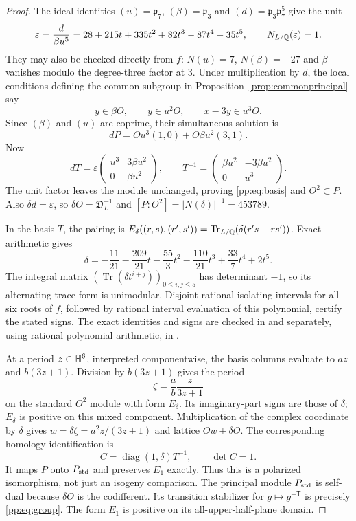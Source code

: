\begin{proof}
The ideal identities $(u)=\mathfrak p_7$, $(\beta)=\mathfrak p_3$ and
$(d)=\mathfrak p_3\mathfrak p_7^5$ give the unit
\[
 \varepsilon=\frac{d}{\beta u^5}
 =28+215t+335t^2+82t^3-87t^4-35t^5,
 \qquad N_{L/\mathbb Q}(\varepsilon)=1.
\]
They may also be checked directly from $f$: $N(u)=7$,
$N(\beta)=-27$ and $\beta$ vanishes modulo the degree-three factor at $3$.
Under multiplication by $d$, the local conditions defining the common
subgroup in Proposition~\ref{prop:commonprincipal} say
\[
 y\in\beta O,\qquad y\in u^2O,\qquad x-3y\in u^3O.
\]
Since $(\beta)$ and $(u)$ are coprime, their simultaneous solution is
\[
 dP=Ou^3(1,0)+O\beta u^2(3,1).
\]
Now
\[
 dT=\varepsilon
 \begin{pmatrix}u^3&3\beta u^2\\0&\beta u^2\end{pmatrix},
 \qquad
 T^{-1}=\begin{pmatrix}\beta u^2&-3\beta u^2\\0&u^3\end{pmatrix}.
\]
The unit factor leaves the module unchanged, proving
\eqref{pp:eq:basis} and $O^2\subset P$. Also $\delta d=\varepsilon$,
so $\delta O=\mathfrak D_L^{-1}$ and
$[P:O^2]=|N(\delta)|^{-1}=453789$.

In the basis $T$, the pairing is
$E_\delta((r,s),(r',s'))=\operatorname{Tr}_{L/\mathbb Q}
(\delta(r's-rs'))$. Exact arithmetic gives
\[
 \delta=-\frac{11}{21}-\frac{209}{21}t-\frac{55}{3}t^2
       -\frac{110}{21}t^3+\frac{33}{7}t^4+2t^5.
\]
The integral matrix $(\operatorname{Tr}(\delta t^{i+j}))_{0\leq i,j\leq5}$
has determinant $-1$, so its alternating trace form is unimodular.
Disjoint rational isolating intervals for all six roots of $f$, followed
by rational interval evaluation of this polynomial, certify the stated
signs. The exact identities and signs are checked in
and separately, using rational polynomial arithmetic, in
.

At a period $z\in\mathbb H^6$, interpreted componentwise, the basis columns
evaluate to $az$ and $b(3z+1)$. Division by $b(3z+1)$ gives the period
\[
 \zeta=\frac{a}{b}\frac{z}{3z+1}
\]
on the standard $O^2$ module with form $E_\delta$. Its imaginary-part
signs are those of $\delta$; $E_\delta$ is positive on this mixed
component. Multiplication of the complex coordinate by $\delta$ gives
$w=\delta\zeta=a^2z/(3z+1)$ and lattice $Ow+\delta O$. The corresponding
homology identification is
\[
 C=\operatorname{diag}(1,\delta)T^{-1},\qquad \det C=1.
\]
It maps $P$ onto $P_{\rm std}$ and preserves $E_1$ exactly. Thus this
is a polarized isomorphism, not just an isogeny comparison.
The principal module $P_{\rm std}$ is self-dual because $\delta O$ is
the codifferent. Its transition stabilizer for $g\mapsto g^{-\mathsf T}$
is precisely \eqref{pp:eq:group}. The form $E_1$ is positive on its
all-upper-half-plane domain.


\end{proof}
